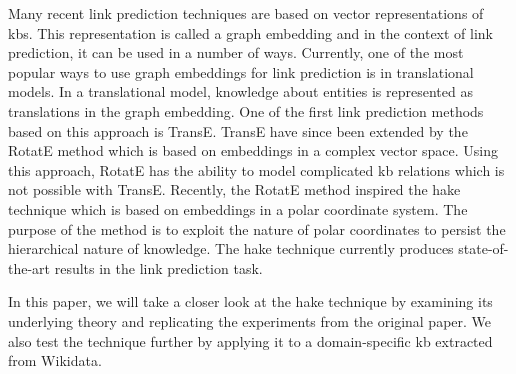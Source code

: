 Many recent link prediction techniques are based on vector representations of \acp{kb}.
This representation is called a graph embedding and in the context of link prediction, it can be used in a number of ways.
Currently, one of the most popular ways to use graph embeddings for link prediction is in translational models.
In a translational model, knowledge about entities is represented as translations in the graph embedding.
One of the first link prediction methods based on this approach is TransE\cite{Bordes2013}.
TransE have since been extended by the RotatE method\cite{Sun2019} which is based on embeddings in a complex vector space.
Using this approach, RotatE has the ability to model complicated \ac{kb} relations which is not possible with TransE.
Recently, the RotatE method inspired the \ac{hake} technique\cite{Zhang2019} which is based on embeddings in a polar coordinate system.
The purpose of the method is to exploit the nature of polar coordinates to persist the hierarchical nature of knowledge.
The \ac{hake} technique currently produces state-of-the-art results in the link prediction task.

In this paper, we will take a closer look at the \ac{hake} technique by examining its underlying theory and replicating the experiments from the original paper.
We also test the technique further by applying it to a domain-specific \ac{kb} extracted from Wikidata.
